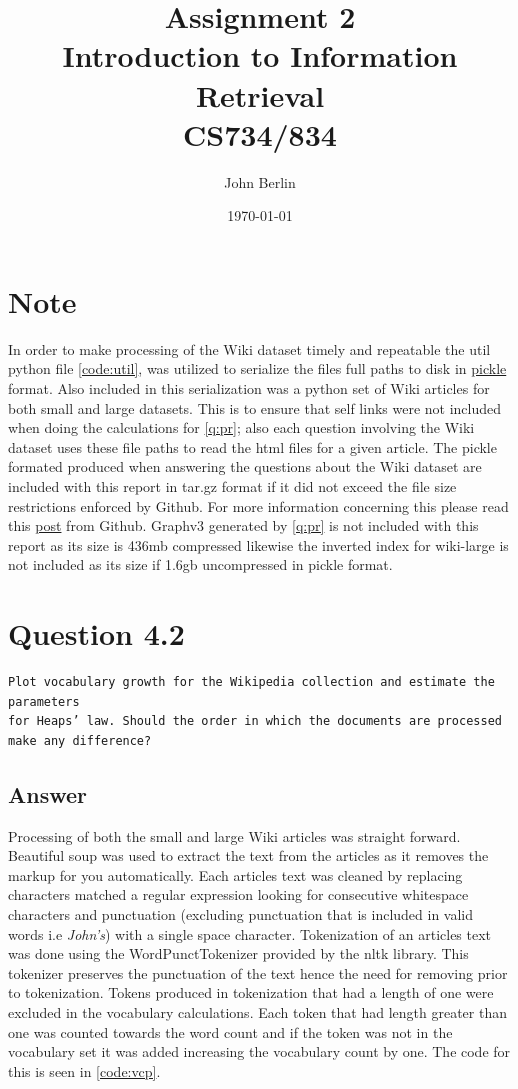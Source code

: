 \documentclass[11pt]{article}
\title{Assignment 2 \\ Introduction to Information Retrieval \\ CS734/834}
\author{John Berlin}
\date{\today}
\begin{document}
\maketitle
\newpage
\section*{Note}
In order to make processing of the Wiki dataset timely and repeatable the util python file \autoref{code:util}, was utilized to serialize the files full paths to disk in \href{https://docs.python.org/3/library/pickle.html}{pickle} format. Also included in this serialization was a python set of Wiki articles for both small and large datasets. This is to ensure that self links were not included when doing the calculations for \autoref{q:pr}; also each question involving the Wiki dataset uses these file paths to read the html files for a given article. \newline \newline The pickle formated produced when answering the questions about the Wiki dataset are included with this report in tar.gz format if it did not exceed the file size restrictions enforced by Github. For more information concerning this please read this \href{https://help.github.com/articles/what-is-my-disk-quota/}{post} from Github. Graphv3 generated by \autoref{q:pr} is not included with this report as its size is 436mb compressed likewise the inverted index for wiki-large is not included as its size if 1.6gb uncompressed in pickle format. 

\section{Question 4.2}
\begin{verbatim}
Plot vocabulary growth for the Wikipedia collection and estimate the parameters 
for Heaps’ law. Should the order in which the documents are processed
make any difference?
\end{verbatim}
\subsection{Answer}
Processing of both the small and large Wiki articles was straight forward. 
Beautiful soup was used to extract the text from the articles as it removes the markup for you automatically. Each articles text was cleaned by replacing characters matched a regular expression looking for consecutive whitespace characters and punctuation (excluding punctuation that is included in valid words i.e \textit{John's})  with a single space character. Tokenization of an articles text was done using the WordPunctTokenizer provided by the nltk library. This tokenizer preserves the punctuation of the text hence the need for removing prior to tokenization. Tokens produced in tokenization that had a length of one were excluded in the vocabulary calculations. Each token that had length greater than one was counted towards the word count and if the token was not in the vocabulary set it was added increasing the vocabulary count by one. The code for this is seen in \autoref{code:vcp}. \newline
\end{document}
